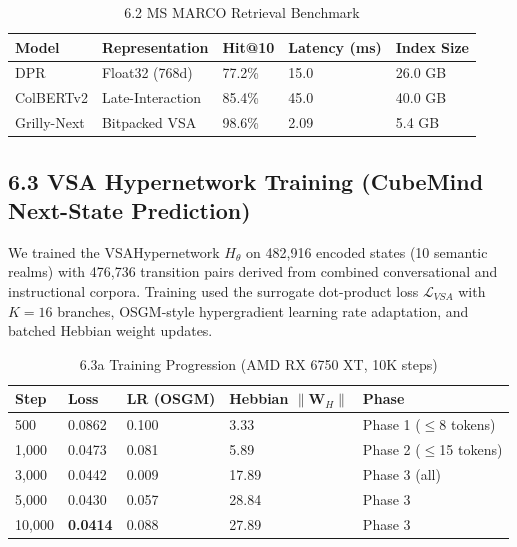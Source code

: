 \documentclass[10pt]{article}
\begin{document}
\begin{table}[h]
\begin{center}
\captionsetup{labelformat=empty}
\caption{6.2 MS MARCO Retrieval Benchmark}
\begin{tabular}{|l|l|l|l|l|}
\hline
Model & Representation & Hit@10 & Latency (ms) & Index Size \\
\hline
DPR & Float32 (768d) & 77.2\% & 15.0 & 26.0 GB \\
\hline
ColBERTv2 & Late-Interaction & 85.4\% & 45.0 & 40.0 GB \\
\hline
Grilly-Next & Bitpacked VSA & 98.6\% & 2.09 & 5.4 GB \\
\hline
\end{tabular}
\end{center}
\end{table}

\subsection*{6.3 VSA Hypernetwork Training (CubeMind Next-State Prediction)}

We trained the VSAHypernetwork $H_\theta$ on 482,916 encoded states (10 semantic realms) with 476,736 transition pairs derived from combined conversational and instructional corpora. Training used the surrogate dot-product loss $\mathcal{L}_{VSA}$ with $K=16$ branches, OSGM-style hypergradient learning rate adaptation, and batched Hebbian weight updates.

\begin{table}[h]
\begin{center}
\captionsetup{labelformat=empty}
\caption{6.3a Training Progression (AMD RX 6750 XT, 10K steps)}
\begin{tabular}{|l|l|l|l|l|}
\hline
Step & Loss & LR (OSGM) & Hebbian $\|\mathbf{W}_H\|$ & Phase \\
\hline
500 & 0.0862 & 0.100 & 3.33 & Phase 1 ($\leq$8 tokens) \\
\hline
1,000 & 0.0473 & 0.081 & 5.89 & Phase 2 ($\leq$15 tokens) \\
\hline
3,000 & 0.0442 & 0.009 & 17.89 & Phase 3 (all) \\
\hline
5,000 & 0.0430 & 0.057 & 28.84 & Phase 3 \\
\hline
10,000 & \textbf{0.0414} & 0.088 & 27.89 & Phase 3 \\
\hline
\end{tabular}
\end{center}
\end{table}
\end{document}
